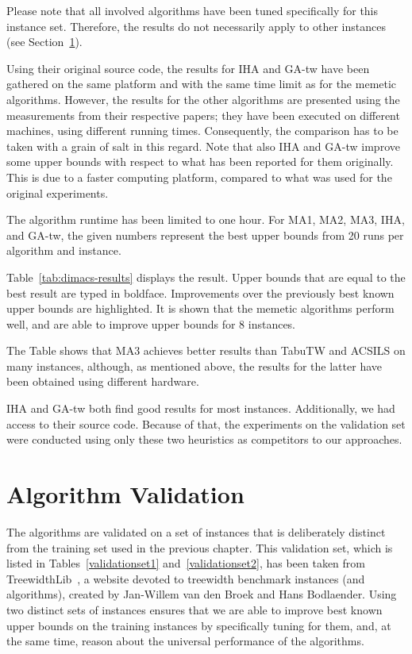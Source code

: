 \documentclass[thesis.tex]{subfiles}
\begin{document}
Please note that all involved algorithms have been tuned specifically for this instance set. Therefore, the results do not necessarily apply to other instances (see Section~\ref{sec:validation-results}).

   Using their original source code, the results for \gls{IHA} and \gls{GA-tw} have been gathered on the same platform and with the same time limit as for the memetic algorithms. However, the results for the other algorithms are presented using the measurements from their respective papers; they have been executed on different machines, using different running times. Consequently, the comparison has to be taken with a grain of salt in this regard. Note that also \gls{IHA} and \gls{GA-tw} improve some upper bounds with respect to what has been reported for them originally. This is due to a faster computing platform, compared to what was used for the original experiments.

   The algorithm runtime has been limited to one hour. For \gls{MA1}, \gls{MA2}, \gls{MA3}, \gls{IHA}, and \gls{GA-tw}, the given numbers represent the best upper bounds from 20 runs per algorithm and instance.

Table~\ref{tab:dimacs-results} displays the result. Upper bounds that are equal to the best result are typed in boldface. Improvements over the previously best known upper bounds are highlighted. It is shown that the memetic algorithms perform well, and are able to improve upper bounds for 8 instances.

The Table shows that \gls{MA3} achieves better results than \gls{TabuTW} and \gls{ACSILS} on many instances, although, as mentioned above, the results for the latter have been obtained using different hardware.

\gls{IHA} and \gls{GA-tw} both find good results for most instances. Additionally, we had access to their source code. Because of that, the experiments on the validation set were conducted using only these two heuristics as competitors to our approaches.




\section{Algorithm Validation}
   \label{sec:validation-results}
%
The algorithms are validated on a set of instances that is deliberately distinct from the training set used in the previous chapter. This validation set, which is listed in Tables~\vref{validationset1} and~\vref{validationset2}, has been taken from TreewidthLib~\parencite{treewidthlib}, a website devoted to treewidth benchmark instances (and algorithms), created by Jan-Willem van den Broek and Hans Bodlaender. Using two distinct sets of instances ensures that we are able to improve best known upper bounds on the training instances by specifically tuning for them, and, at the same time, reason about the universal performance of the algorithms.
\end{document}
